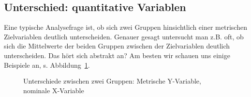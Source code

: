 \documentclass[
  letterpaper,
]{scrbook}
\theoremstyle{definition}
\theoremstyle{definition}
\theoremstyle{definition}
\theoremstyle{remark}
\begin{document}
\subsection{Unterschied: quantitative
Variablen}\label{unterschied-quantitative-variablen}

Eine typische Analysefrage ist, ob sich zwei Gruppen hinsichtlich einer
metrischen Zielvariablen deutlich unterscheiden. Genauer gesagt
untersucht man z.B. oft, ob sich die Mittelwerte der beiden Gruppen
zwischen der Zielvariablen deutlich unterscheiden. Das hört sich
abstrakt an? Am besten wir schauen uns einige Beispiele an, s.
Abbildung~\ref{fig-compare-groups1}.

\begin{figure}

\begin{minipage}{0.50\linewidth}



\end{minipage}%
%
\begin{minipage}{0.50\linewidth}



\end{minipage}%

\caption{\label{fig-compare-groups1}Unterschiede zwischen zwei Gruppen:
Metrische Y-Variable, nominale X-Variable}

\end{figure}%
\end{document}

